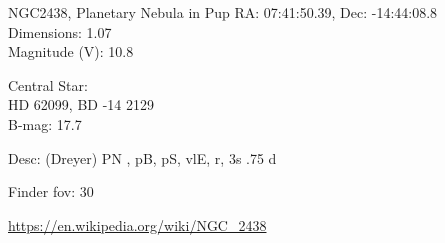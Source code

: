 \begin{block}{NGC2438, Planetary Nebula in Pup}
    RA: 07:41:50.39, Dec: -14:44:08.8 \\ 
    Dimensions: 1.07 \\ 
    Magnitude (V): 10.8

    Central Star: \\ 
      \hspace{1em}HD 62099, BD -14 2129 \\ 
      \hspace{1em}B-mag: 17.7 

    Desc: (Dreyer) PN , pB, pS, vlE, r, 3s .75 d 

    Finder fov: 30 

    \url{https://en.wikipedia.org/wiki/NGC_2438} 
\end{block}